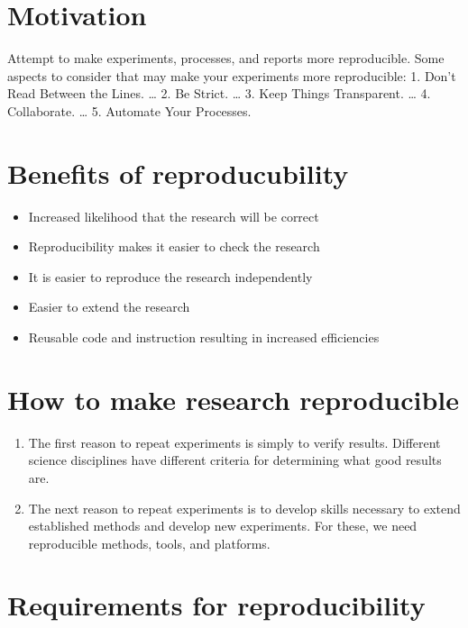\documentclass[]{book}
\providecommand{\tightlist}{%
  \setlength{\itemsep}{0pt}\setlength{\parskip}{0pt}}
\begin{document}
\hypertarget{motivation}{%
\section{Motivation}\label{motivation}}

Attempt to make experiments, processes, and reports more reproducible.
Some aspects to consider that may make your experiments more reproducible:
1. Don't Read Between the Lines. \ldots{}
2. Be Strict. \ldots{}
3. Keep Things Transparent. \ldots{}
4. Collaborate. \ldots{}
5. Automate Your Processes.

\hypertarget{benefits-of-reproducubility}{%
\section{Benefits of reproducubility}\label{benefits-of-reproducubility}}

\begin{itemize}
\tightlist
\item
  Increased likelihood that the research will be correct
\item
  Reproducibility makes it easier to check the research
\item
  It is easier to reproduce the research independently
\item
  Easier to extend the research
\item
  Reusable code and instruction resulting in increased efficiencies
\end{itemize}

\hypertarget{how-to-make-research-reproducible}{%
\section{How to make research reproducible}\label{how-to-make-research-reproducible}}

\begin{enumerate}
\def\labelenumi{\arabic{enumi})}
\tightlist
\item
  The first reason to repeat experiments is simply to verify results. Different science disciplines have different criteria for determining what good results are.
\item
  The next reason to repeat experiments is to develop skills necessary to extend established methods and develop new experiments. For these, we need reproducible methods, tools, and platforms.
\end{enumerate}

\hypertarget{requirements-for-reproducibility}{%
\section{Requirements for reproducibility}\label{requirements-for-reproducibility}}
\end{document}
